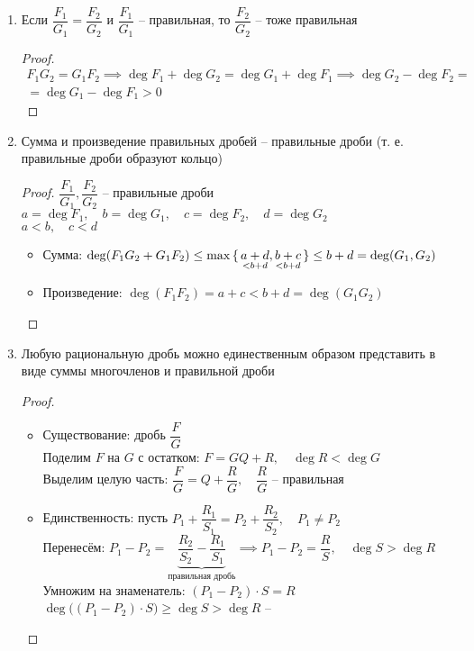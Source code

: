 \begin{properties}
	\hfill
    \begin{enumerate}
        \item Если $\dfrac{F_1}{G_1} = \dfrac{F_2}{G_2}$ и $\dfrac{F_1}{G_1}$ -- правильная, то $\dfrac{F_2}{G_2}$ -- тоже правильная
        \begin{proof}
            \begin{multline*}
                F_1G_2 = G_1F_2 \implies \deg F_1 + \deg G_2 = \deg G_1 + \deg F_1 \implies \deg G_2 - \deg F_2 = \\ = \deg G_1 - \deg F_1 > 0
            \end{multline*}
        \end{proof}
        \item Сумма и произведение правильных дробей -- правильные дроби (т. е. правильные дроби образуют кольцо)
        \begin{proof}
            $\dfrac{F_1}{G_1}, \dfrac{F_2}{G_2}$ -- правильные дроби \\
            $a = \deg F_1, \quad b = \deg G_1, \quad c = \deg F_2, \quad d = \deg G_2$ \\
            $ a < b, \quad c < d $
            \begin{itemize}
                \item Сумма: $\deg(F_1G_2 + G_1F_2) \le \max \set{\underset{< b + d}{a + d}, \underset{< b + d}{b + c}} \le b + d = \deg(G_1, G_2)$
                \item Произведение: $\deg(F_1F_2) = a + c < b + d = \deg(G_1G_2) $
            \end{itemize}
        \end{proof}
        \item Любую рациональную дробь можно единественным образом представить в виде суммы многочленов и правильной дроби
        \begin{proof}
            \hfill
            \begin{itemize}
                \item Существование: дробь $\dfrac{F}G$ \\
                Поделим $F$ на $G$ с остатком: $F = GQ + R, \quad \deg R < \deg G$ \\
                Выделим целую часть: $\dfrac{F}G = Q + \dfrac{R}G, \quad \dfrac{R}G$ -- правильная
                \item Единственность: пусть $P_1 + \dfrac{R_1}{S_1} = P_2 + \dfrac{R_2}{S_2}, \quad P_1 \ne P_2$ \\
                Перенесём: $P_1 - P_2 = \underbrace{\dfrac{R_2}{S_2} - \dfrac{R_1}{S_1}}_{\text{правильная дробь}} \implies P_1 - P_2 = \dfrac{R}S, \quad \deg S > \deg R$ \\
                Умножим на знаменатель: $(P_1 - P_2) \cdot S = R$ \\
                $\deg \bigg( (P_1 - P_2) \cdot S \bigg) \ge \deg S > \deg R$ -- \contra
            \end{itemize}
        \end{proof}
    \end{enumerate}
\end{properties}

